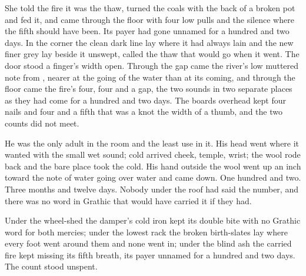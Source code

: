 She told the fire it was the thaw, turned the coals with the back of a broken pot and fed it, and  came through the floor with four low pulls and the silence where the fifth should have been. Its payer had gone unnamed for a hundred and two days. In the corner the clean dark line lay where it had always lain and the new finer grey lay beside it unswept, called the thaw that would go when it went. The door stood a finger's width open. Through the gap came the river's low muttered note from , nearer at the going of the water than at its coming, and through the floor came the fire's four, four and a gap, the two sounds in two separate places as they had come for a hundred and two days. The boards overhead kept four nails and four and a fifth that was a knot the width of a thumb, and the two counts did not meet.

He was the only adult in the room and the least use in it. His head went where it wanted with the small wet sound; cold arrived cheek, temple, wrist; the wool rode back and the bare place took the cold. His hand outside the wool went up an inch toward the note of water going over water and came down. One hundred and two. Three months and twelve days. Nobody under the roof had said the number, and there was no word in Grathic that would have carried it if they had.

Under the wheel-shed the damper's cold iron kept its double bite with no Grathic word for both mercies; under the lowest rack the broken birth-slates lay where every foot went around them and none went in; under the blind ash the carried fire kept missing its fifth breath, its payer unnamed for a hundred and two days. The count stood unspent.
